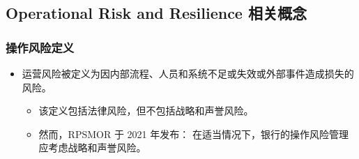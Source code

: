 \subsection{Operational Risk and Resilience 相关概念}

\subsubsection{操作风险定义} 
\begin{itemize}
\item 运营风险被定义为因内部流程、人员和系统不足或失效或外部事件造成损失的风险。
    \begin{itemize}
    \item 该定义包括法律风险，但不包括战略和声誉风险。
    \item 然而，RPSMOR 于 2021 年发布： 在适当情况下，银行的操作风险管理应考虑战略和声誉风险。
    \end{itemize}
\end{itemize}




